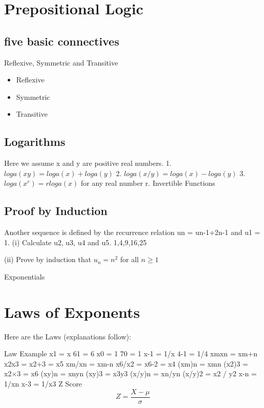 \documentclass[]{report}
\begin{document}
\newpage

\section*{Prepositional Logic}

\subsection{five basic connectives}


Reflexive, Symmetric and Transitive

\begin{itemize} 
\item Reflexive
\item Symmetric
\item Transitive
\end{itemize}

\subsection{Logarithms}


Here we
assume x and y are positive real numbers.
1. $loga(xy) = loga(x) + loga(y)$
2. $loga(x/y)= loga(x) - loga(y)$
3. $loga (x^r) = r loga(x)$ for any real number r.
Invertible Functions

\subsection{Proof by Induction}

Another sequence is defined by the recurrence relation un = un-1+2n-1 and
u1 = 1.
(i) Calculate u2, u3, u4 and u5.
1,4,9,16,25

(ii) Prove by induction that $u_n = n^2$ for all $n \geq 1$

Exponentials

\section{Laws of Exponents}
Here are the Laws (explanations follow):

Law	Example
x1 = x	61 = 6
x0 = 1	70 = 1
x-1 = 1/x	4-1 = 1/4
xmxn = xm+n	x2x3 = x2+3 = x5
xm/xn = xm-n	x6/x2 = x6-2 = x4
(xm)n = xmn	(x2)3 = x2×3 = x6
(xy)n = xnyn	(xy)3 = x3y3
(x/y)n = xn/yn	(x/y)2 = x2 / y2
x-n = 1/xn	x-3 = 1/x3
Z Score
\[ Z = \frac{X - \mu}{\sigma} \]
\end{document}
